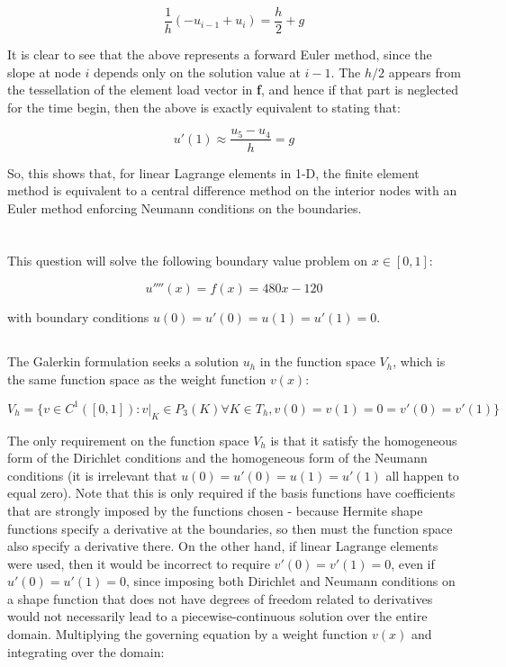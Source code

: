 \documentclass[10pt]{article}
\newcommand{\beq}{\begin{equation}}
\newcommand{\eeq}{\end{equation}}
\begin{document}
\beq
\frac{1}{h}(-u_{i-1}+u_i)=\frac{h}{2}+g
\eeq

It is clear to see that the above represents a forward Euler method, since the slope at node \(i\) depends only on the solution value at \(i-1\). The \(h/2\) appears from the tessellation of the element load vector in \textbf{f}, and hence if that part is neglected for the time begin, then the above is exactly equivalent to stating that:

\beq
u'(1)\approx\frac{u_5-u_4}{h}=g
\eeq

So, this shows that, for linear Lagrange elements in 1-D, the finite element method is equivalent to a central difference method on the interior nodes with an Euler method enforcing Neumann conditions on the boundaries.

\section{}

This question will solve the following boundary value problem on \(x\in[0,1]\):

\beq
u''''(x)=f(x)=480x-120
\eeq

with boundary conditions \(u(0)=u'(0)=u(1)=u'(1)=0\). 

\subsection{}

The Galerkin formulation seeks a solution \(u_h\) in the function space \(V_h\), which is the same function space as the weight function \(v(x)\):

\beq
V_h=\{v\in C^1([0,1]):v\rvert_K\in P_3(K) \forall K\in T_h, v(0)=v(1)=0=v'(0)=v'(1)\}
\eeq

The only requirement on the function space \(V_h\) is that it satisfy the homogeneous form of the Dirichlet conditions and the homogeneous form of the Neumann conditions (it is irrelevant that \(u(0)=u'(0)=u(1)=u'(1)\) all happen to equal zero). Note that this is only required if the basis functions have coefficients that are strongly imposed by the functions chosen - because Hermite shape functions specify a derivative at the boundaries, so then must the function space also specify a derivative there. On the other hand, if linear Lagrange elements were used, then it would be incorrect to require \(v'(0)=v'(1)=0\), even if \(u'(0)=u'(1)=0\), since imposing both Dirichlet and Neumann conditions on a shape function that does not have degrees of freedom related to derivatives would not necessarily lead to a piecewise-continuous solution over the entire domain. Multiplying the governing equation by a weight function \(v(x)\) and integrating over the domain:
\end{document}
